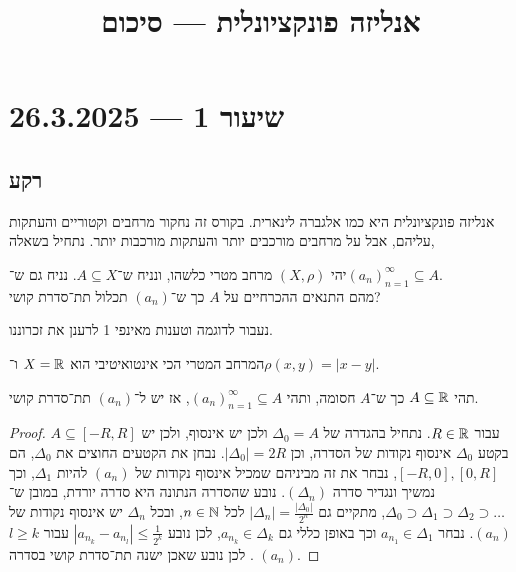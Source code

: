 
\title{אנליזה פונקציונלית --- סיכום}
\setcounter{secnumdepth}{2}

\usepackage{fancyhdr}
\pagestyle{fancy}
\renewcommand{\headrulewidth}{0pt}


\maketitle
\maketitleprint[teal]

\tableofcontents

\section{שיעור 1 --- 26.3.2025}
\subsection{רקע}
אנליזה פונקציונלית היא כמו אלגברה לינארית.
בקורס זה נחקור מרחבים וקטוריים והעתקות עליהם, אבל על מרחבים מורכבים יותר והעתקות מורכבות יותר.
נתחיל בשאלה,
\begin{exercise}
	יהי $(X, \rho)$ מרחב מטרי כלשהו, ונניח ש־$A \subseteq X$.
	נניח גם ש־${(a_n)}_{n = 1}^\infty \subseteq A$. \\
	מהם התנאים ההכרחיים על $A$ כך ש־$(a_n)$ תכלול תת־סדרת קושי?
\end{exercise}
נעבור לדוגמה וטענות מאינפי 1 לרענן את זכרוננו.
\begin{example}
	המרחב המטרי הכי אינטואיטיבי הוא $X = \mathbb{R}$ ו־$\rho(x, y) = |x - y|$.
\end{example}
\begin{proposition}
	תהי $A \subseteq \mathbb{R}$ כך ש־$A$ חסומה, ותהי ${(a_n)}_{n = 1}^\infty \subseteq A$,
	אז יש ל־$(a_n)$ תת־סדרת קושי.
\end{proposition}
\begin{proof}
	$A \subseteq [-R, R]$ עבור $R \in \mathbb{R}$.
	נתחיל בהגדרה של $\Delta_0 = A$ ולכן יש אינסוף, ולכן יש בקטע $\Delta_0$ אינסוף נקודות של הסדרה, וכן $|\Delta_0| = 2R$.
	נבחן את הקטעים החוצים את $\Delta_0$, הם $[-R, 0], [0, R]$, נבחר את זה מביניהם שמכיל אינסוף נקודות של $(a_n)$ להיות $\Delta_1$, וכך נמשיך ונגדיר סדרה $(\Delta_n)$.
	נובע שהסדרה הנתונה היא סדרה יורדת, במובן ש־$\Delta_0 \supset \Delta_1 \supset \Delta_2 \supset \dots$, מתקיים גם $|\Delta_n| = \frac{|\Delta_0|}{2^n}$ לכל $n \in \mathbb{N}$, ובכל $\Delta_n$ יש אינסוף נקודות של $(a_n)$.
	נבחר $a_{n_1} \in \Delta_1$ וכך באופן כללי גם $a_{n_k} \in \Delta_k$, לכן נובע $|a_{n_k} - a_{n_l}| \le \frac{1}{2^k}$ עבור $l \ge k$.
	לכן נובע שאכן ישנה תת־סדרת קושי בסדרה $(a_n)$.
\end{proof}
